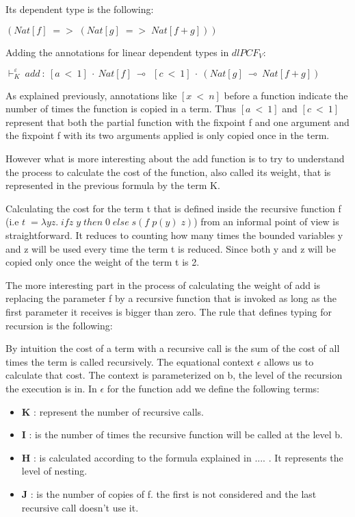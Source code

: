 \documentclass[a4paper,12pt]{article}
\begin{document}
Its dependent type is the following:

\begin{center}
$(Nat[f]\; =>\;(Nat[g]\; =>\;Nat[f + g]))$
\end{center}

Adding the annotations for linear dependent types in $ dlPCF_{V} $:

\begin{center}
$\vdash^{\varepsilon}_{K}~add~:~[a~<~1]~\cdot~Nat[f]~\multimap~~[c~<~1]~\cdot~(Nat[g]~\multimap~Nat[f + g])$
\end{center}

As explained previously, annotations like $[x~<~n]$ before a function
indicate the number of times the function is copied in a term. Thus
$[a~<~1]$ and $[c~<~1]$ represent that both the partial function with
the fixpoint f and one argument and the fixpoint f with its two
arguments applied is only copied once in the term.

However what is more interesting about the add function is to try to
understand the process to calculate the cost of the function, also
called its weight, that is represented in the previous formula by the
term K. 

Calculating the cost for the term t that is defined inside the
recursive function f (i.e $t\;=\lambda
yz.\;ifz\;y\;then\;0\;else\;s(f\;p(y)\;z)$) from an informal point of
view is straightforward. It reduces to counting how many times the
bounded variables y and z will be used every time the term t is
reduced. Since both y and z will be copied only once the weight of the
term t is 2.

The more interesting part in the process of calculating the weight of
add is replacing the parameter f by a recursive function that is
invoked as long as the first parameter it receives is bigger than
zero. The rule that defines typing for recursion is the following:

\begin{center}
\end{center}

By intuition the cost of a term with a recursive call is the sum of
the cost of all times the term is called recursively. The equational
context $\epsilon$ allows us to calculate that cost. The context is
parameterized on b, the level of the recursion the execution is in. In 
$\epsilon$ for the function add we define the following terms:


\begin{itemize}
\item \textbf{K} : represent the number of recursive calls. 
\item \textbf{I} : is the number of times the recursive function will be called at
the level b. 
\item \textbf{H} : is calculated according to the formula explained in .... . It
represents the level of nesting.
\item \textbf{J} : is the number of copies of f. the first is not considered and
the last recursive call doesn't use it.
\end{itemize}
\end{document}
